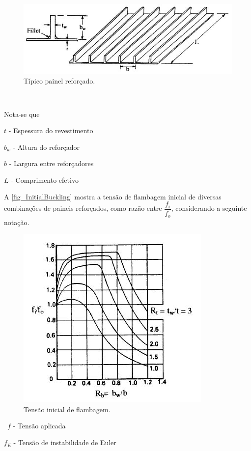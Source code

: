 \begin{figure}[h]
	\caption{\label{fig_StiffenedPanels}Típico painel reforçado.}
  \centering
  \includegraphics[scale=1.0]{figura/StiffenedPanel}
\end{figure}
\

Nota-se que\

$t$ -  Espessura do revestimento \

$b_w$ - Altura do reforçador \

$b$ - Largura entre reforçadores \

$L$ - Comprimento efetivo \

A \autoref{fig_InitialBuckling} mostra a tensão de flambagem inicial de diversas combinações de paineis reforçados, como razão entre $\dfrac{f_i}{f_o}$, considerando a seguinte notação.

\begin{figure}[h]
	\caption{\label{fig_InitialBuckling}Tensão inicial de flambagem.}
  \centering
  \includegraphics[scale=1.0]{figura/InitialBuckling}
\end{figure}
\
$f$ - Tensão aplicada\

$f_E$ - Tensão de instabilidade de Euler\

